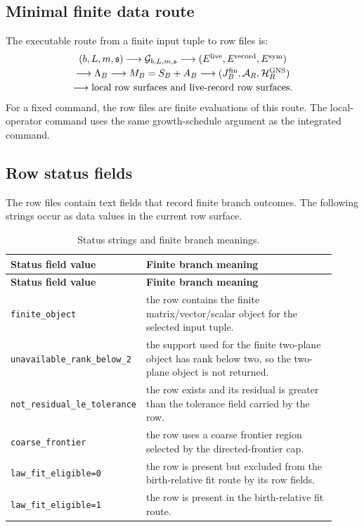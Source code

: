 \documentclass[11pt]{article}
\theoremstyle{remark}
\newcommand{\code}[1]{\texttt{#1}}
\numberwithin{equation}{section}
\begin{document}
\subsection{Minimal finite data route}
The executable route from a finite input tuple to row files is:
\[
\begin{array}{c}
(b,L,m,\mathfrak{s})
\longrightarrow \mathcal G_{b,L,m,\mathfrak{s}}
\longrightarrow (E^{\rm live},E^{\rm record},E^{\rm sym})\\[0.25em]
\longrightarrow \Lambda_B
\longrightarrow M_B=S_B+A_B
\longrightarrow (J_B^{\rm fin},\mathcal A_R,\mathcal H_R^{\rm GNS})\\[0.25em]
\longrightarrow \text{local row surfaces and live-record row surfaces}.
\end{array}
\]
For a fixed command, the row files are finite evaluations of this route. The local-operator command uses the same growth-schedule argument as the integrated command.

\subsection{Row status fields}
The row files contain text fields that record finite branch outcomes. The following strings occur as data values in the current row surface.
\begin{longtable}{>{\raggedright\arraybackslash}p{0.24\linewidth}>{\raggedright\arraybackslash}p{0.68\linewidth}}
\caption{Status strings and finite branch meanings.}\label{tab:status-strings}\\
\toprule
\textbf{Status field value} & \textbf{Finite branch meaning}\\
\midrule
\endfirsthead
\toprule
\textbf{Status field value} & \textbf{Finite branch meaning}\\
\midrule
\endhead
\code{finite\_object} & the row contains the finite matrix/vector/scalar object for the selected input tuple.\\
\hline
\code{unavailable\_rank\_below\_2} & the support used for the finite two-plane object has rank below two, so the two-plane object is not returned.\\
\hline
\code{not\_residual\_le\_tolerance} & the row exists and its residual is greater than the tolerance field carried by the row.\\
\hline
\code{coarse\_frontier} & the row uses a coarse frontier region selected by the directed-frontier cap.\\
\hline
\code{law\_fit\_eligible=0} & the row is present but excluded from the birth-relative fit route by its row fields.\\
\hline
\code{law\_fit\_eligible=1} & the row is present in the birth-relative fit route.\\
\bottomrule
\end{longtable}
\end{document}
